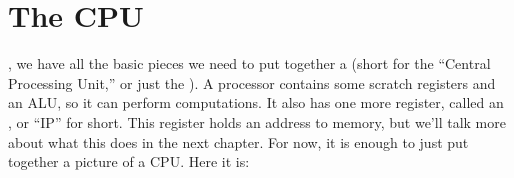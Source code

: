 \documentclass[../../../main.tex]{subfiles}
\begin{document}
\section{The CPU}

, we have all the basic pieces we need to put together a  (short for the ``Central Processing Unit,'' or just the ). A processor contains some scratch registers and an ALU, so it can perform computations. It also has one more register, called an , or ``IP'' for short. This register holds an address to memory, but we'll talk more about what this does in the next chapter. For now, it is enough to just put together a picture of a CPU. Here it is:
\end{document}
